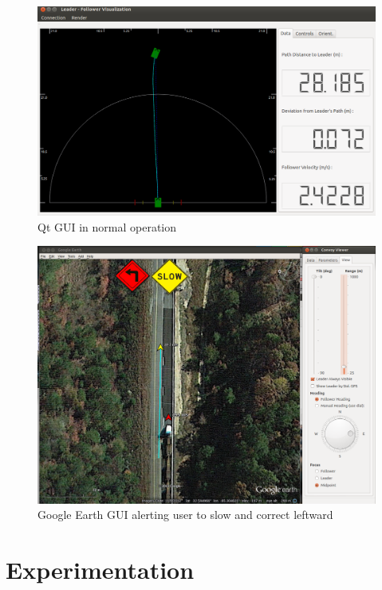 \documentclass[twocolumn,10pt]{article}
\begin{document}
  \begin{figure}[ht] \centering
    \includegraphics[width=\columnwidth] {../graphics/final_design_data.png}
    \caption{Qt GUI in normal operation} \label{fig:qt_normal}
  \end{figure}

  \begin{figure}[ht] \centering
    \includegraphics[width=\columnwidth] {../graphics/earth_slow.png}
    \caption{Google Earth GUI alerting user to slow and correct leftward} \label{fig:earth_alerts}
  \end{figure}


\section*{Experimentation} \label{sec:exper}
\end{document}
